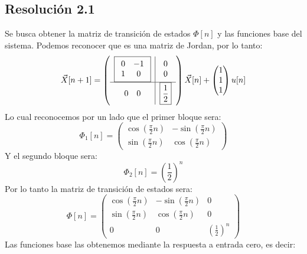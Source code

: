 \documentclass[
  11pt,
  letterpaper,
   addpoints,
   answers
  ]{exam}
\begin{document}
\begin{questions}
\begin{solution}
\subsection*{Resolución 2.1}
Se busca obtener la matriz de transición de estados $\Phi[n]$ y las funciones base del sistema. Podemos reconocer que es una matriz de Jordan, por lo tanto:
\begin{equation}
  \vec{X}[n+1] =
  \left(
    \begin{array}{c|c}
      \fbox{$\begin{array}{cc} 0 & -1 \\ 1 & 0 \end{array}$} & \begin{array}{c} 0 \\ 0 \end{array} \\
      \hline
      \begin{array}{cc} 0 & 0 \end{array} & \boxed{\frac{1}{2}}
    \end{array}
  \right)
  \vec{X}[n] + \begin{pmatrix} 1 \\ 1 \\ 1 \end{pmatrix} u[n]
\end{equation}
Lo cual reconocemos por un lado que el primer bloque sera:
\begin{equation}
  \Phi_1[n] = \begin{pmatrix} \cos\left(\frac{\pi}{2} n\right) & -\sin\left(\frac{\pi}{2} n\right) \\ \sin\left(\frac{\pi}{2} n\right) & \cos\left(\frac{\pi}{2} n\right) \end{pmatrix}
\end{equation}
Y el segundo bloque sera:
\begin{equation}
  \Phi_2[n] = \left(\frac{1}{2}\right)^n
\end{equation}
Por lo tanto la matriz de transición de estados sera:
\begin{equation}
  \Phi[n] = \begin{pmatrix} \cos\left(\frac{\pi}{2} n\right) & -\sin\left(\frac{\pi}{2} n\right) & 0 \\ \sin\left(\frac{\pi}{2} n\right) & \cos\left(\frac{\pi}{2} n\right) & 0 \\ 0 & 0 & \left(\frac{1}{2}\right)^n \end{pmatrix}
\end{equation}
Las funciones base las obtenemos mediante la respuesta a entrada cero, es decir:

\end{solution}
\end{questions}
\end{document}
